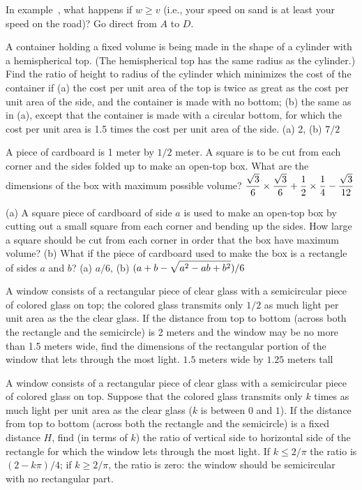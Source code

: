 \exercise
In example~, what happens if
$w\ge v$ (i.e., your speed on sand is at least your speed on the
road)?
\answer Go direct from $A$ to $D$.
\endanswer
\endexercise

\exercise
A container holding a fixed volume is being made in the shape of a cylinder
with a hemispherical top.  (The hemispherical top has the same radius
as the cylinder.)  Find the ratio of height to radius of the cylinder which
minimizes the cost of the container if (a) the cost per unit area of the
top is twice as great as the cost per unit area of the side, and the
container is made with no bottom; (b) the same as in (a), except that the
container is made with a circular bottom, for which the cost per unit area is
1.5 times the cost per unit area of the side.
\answer (a) 2, (b) $7/2$
\endanswer
\endexercise

\exercise A piece of cardboard is 1 meter by $1/2$ meter. A square is
to be cut from each corner and the sides folded up to make an open-top
box. What are the dimensions of the box with maximum possible volume?
\answer $\displaystyle{\sqrt3\over6}\times{\sqrt3\over6}+{1\over2}\times
{1\over4}-{\sqrt3\over 12}$
\endanswer

\endexercise

\exercise (a) A square piece of cardboard of side $a$ is used to make
an open-top box by cutting out a small square from each corner and
bending up the sides.  How large a square should be cut from each
corner in order that the box have maximum volume? (b) What if the
piece of cardboard used to make the box is a rectangle of sides $a$
and $b$?  
\answer (a) $a/6$, (b) $\displaystyle (a+b-\sqrt{a^2-ab+b^2})/6$
\endanswer 
{}
\endexercise

\exercise A window consists of a rectangular piece of clear glass with
a semicircular piece of colored glass on top; the
colored glass transmits only $1/2$ as much light per unit area as the
the clear glass.  If the distance from
top to bottom (across both the rectangle and the semicircle) is
2 meters and the window may be no more than 1.5 meters wide, find the
dimensions of the rectangular portion of the window that lets through
the most light.
\answer $1.5$ meters wide by $1.25$ meters tall
\endanswer 
\endexercise

\exercise A window consists of a rectangular piece of clear glass with
a semicircular piece of colored glass on top.  Suppose that the
colored glass transmits only $k$ times as much light per unit area as
the clear glass ($k$ is between $0$ and $1$).  If the distance from
top to bottom (across both the rectangle and the semicircle) is a
fixed distance $H$,
find (in terms of $k$) the ratio of vertical side to horizontal side
of the rectangle for which the window lets through the most light.
\answer If $k\le 2/\pi$ the ratio is $(2-k\pi)/4$; if $k\ge 2/\pi$,
the ratio is zero: the window should be semicircular with no
rectangular part.
\endanswer
\endexercise

